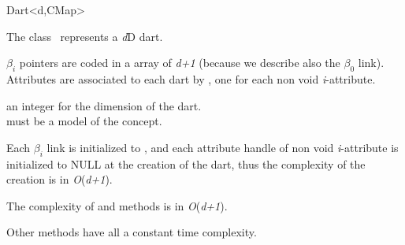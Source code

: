 \ccRefPageBegin
\begin{ccRefClass}{Dart<d,CMap>}


\ccDefinition
  
The class \ccRefName\ represents a \emph{d}D dart.

$\beta_i$ pointers are coded in a array of \emph{d+1} 
(because we describe also the $\beta_0$ link).  Attributes are
associated to each dart by , one for each
non void \emph{i}-attribute.

\ccIsModel
{}

\ccParameters
{} an integer for the dimension of the dart.\\
 must be a model of the  concept.


\ccTypes
{}
\ccGlue
{}

\ccGlue
{}


Each $\beta_i$ link is initialized to , and each 
attribute handle of non void \emph{i}-attribute is initialized to NULL
at the creation of the dart, thus the complexity of the creation is in
\emph{O}(\emph{d+1}).

The complexity of  and  methods is in
\emph{O}(\emph{d+1}).

Other methods have all a constant time complexity.

\ccSeeAlso
{}

\end{ccRefClass}
\ccRefPageEnd
